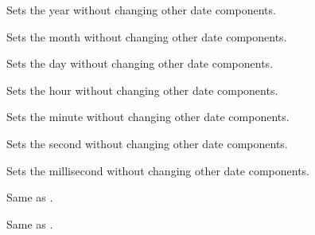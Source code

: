 
Sets the year without changing other date components.


\label{wxdatetimesetmonth}


Sets the month without changing other date components.


\label{wxdatetimesetday}


Sets the day without changing other date components.


\label{wxdatetimesethour}


Sets the hour without changing other date components.


\label{wxdatetimesetminute}


Sets the minute without changing other date components.


\label{wxdatetimesetsecond}


Sets the second without changing other date components.


\label{wxdatetimesetmillisecond}


Sets the millisecond without changing other date components.


\label{wxdatetimeoperatoreqtimet}


Same as .


\label{wxdatetimeoperatoreqtm}


Same as .

